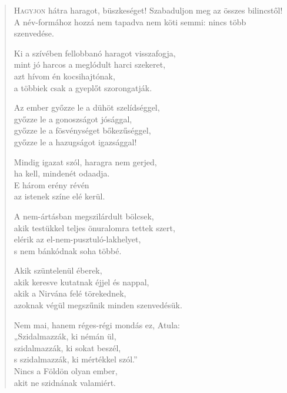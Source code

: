 
\begin{verse}

{\par%
\lettrine{H}{agyjon} {\LettrineTextFont hátra haragot, büszkeséget!}\newline
Szabaduljon meg az összes bilincstől!\newline
A név-formához hozzá nem tapadva\verselinebreak
nem köti semmi: nincs több szenvedése.
\par}

 Ki a szívében fellobbanó haragot visszafogja,\\
mint jó harcos a meglódult harci szekeret,\\
azt hívom én kocsihajtónak,\\
a többiek csak a gyeplőt szorongatják.

 Az ember győzze le a dühöt szelídséggel,\\
győzze le a gonoszságot jósággal,\\
győzze le a fösvénységet bőkezűséggel,\\
győzze le a hazugságot igazsággal!

 Mindig igazat szól, haragra nem gerjed,\\
ha kell, mindenét odaadja.\\
E három erény révén\\
az istenek színe elé kerül.

 A nem-ártásban megszilárdult bölcsek,\\
akik testükkel teljes önuralomra tettek szert,\\
elérik az el-nem-pusztuló-lakhelyet,\\
s nem bánkódnak soha többé.

 Akik szüntelenül éberek,\\
akik keresve kutatnak éjjel és nappal,\\
akik a Nirvána felé törekednek,\\
azoknak végül megszűnik minden szenvedésük.

 Nem mai, hanem réges-régi mondás ez, Atula:\\
„Szidalmazzák, ki némán ül,\\
szidalmazzák, ki sokat beszél,\\
s szidalmazzák, ki mértékkel szól.”\\
Nincs a Földön olyan ember,\\
akit ne szidnának valamiért.


\end{verse}
